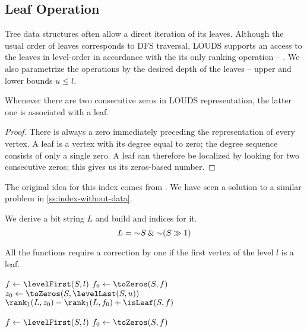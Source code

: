 \subsection{\label{ss:leaf-queries}Leaf Operation}

Tree data structures often allow a direct iteration of its leaves.
Although the usual order of leaves corresponds to DFS traversal, LOUDS supports an access to the leaves in level-order in accordance with the its only ranking operation -- \loRank{}.
We also parametrize the operations by the desired depth of the leaves -- upper and lower bounds $u \le l$.

\begin{lemma}
	Whenever there are two consecutive zeros in LOUDS representation, the latter one is associated with a leaf.
\end{lemma}
\begin{proof}
	There is always a zero immediately preceding the representation of every vertex.
	A leaf is a vertex with its degree equal to zero; the degree sequence consists of only a single zero.
	A leaf can therefore be localized by looking for two consecutive zeros; this gives us its zeros-based number.
\end{proof}

The original idea for this index comes from \cite{munro1998space}.
We have seen a solution to a similar problem in \ref{ss:index-without-data}.

We derive a bit string $L$ and build \rank{} and \select{} indices for it.
$$L = \mathord{\sim} S \mathbin{\&} \mathord{\sim} (S \mathbin{\gg} 1)$$

All the functions require a correction by one if the first vertex of the level $l$ is a leaf.

\begin{algorithm}
\begin{algorithmic}
	\State $f \gets \levelFirst(S, l)$ 
	\State $f_0 \gets \toZeros(S, f)$
	\State $z_0 \gets \toZeros(S, \levelLast(S, u))$
	\State \Return $\rank_1(L, z_0) - \rank_1(L, f_0) + \isLeaf(S, f)$
\EndFunction
\end{algorithmic}
\end{algorithm}

\begin{algorithm}
\begin{algorithmic}	
 
	\State $f \gets \levelFirst(S, l)$ 
	\State $f_0 \gets \toZeros(S, f)$
	\State {}
\EndFunction
\end{algorithmic}
\end{algorithm}

